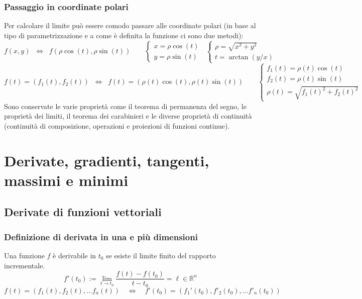 \documentclass[a4paper]{article}
\newcommand\Rn{\mathbb{R}^n}  %
\begin{document}
\subsubsection*{Passaggio in coordinate polari}
Per calcolare il limite può essere comodo passare alle coordinate polari (in base al tipo di parametrizzazione e a come è definita
la funzione ci sono due metodi):
\[f(x,y) \;\;\Leftrightarrow \;\; f(\rho\cos(t),\rho\sin(t)) \qquad \begin{cases}
	x = \rho\cos(t) \\
	y = \rho\sin(t)
\end{cases} \;\;\begin{cases}
	\rho = \sqrt{x^2 + y^2} \\
	t = \arctan (y/x)
\end{cases}\]
\[f(t) = (f_1(t),f_2(t)) \;\;\Leftrightarrow \;\; f(t) = (\rho(t)\cos(t),\rho(t)\sin(t)) \qquad \begin{cases}
	f_1(t) = \rho(t)\cos(t) \\
	f_2(t) = \rho(t)\sin(t) \\
	\rho(t) = \sqrt{f_1(t)^2 + f_2(t)^2}
\end{cases}\]
Sono conservate le varie proprietà come il teorema di permanenza del segno, le proprietà dei limiti, il teorema dei carabinieri
e le diverse proprietà di continuità (continuità di composizione, operazioni e proiezioni di funzioni continue).

\newpage


\section{ Derivate, gradienti, tangenti, massimi e minimi}
\subsection{Derivate di funzioni vettoriali}
\subsubsection*{Definizione di derivata in una e più dimensioni}
Una funzione \(f\) è derivabile in \(t_0\) se esiste il limite finito del rapporto incrementale.
\[f'(t_0) := \lim_{t \to t_0} \frac{f(t)-f(t_0)}{t-t_0} = \ell \in \Rn\]
\[f(t) = \left(f_1(t), f_2(t), \dots f_n(t) \right) \quad \Leftrightarrow \quad f'(t_0) = \left( f_1'(t_0), f'_2(t_0), \dots f'_n(t_0)\right)\]
\end{document}
